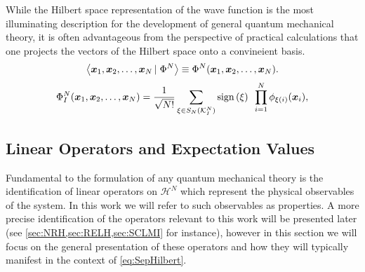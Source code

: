 While the Hilbert space representation of the wave function is the most illuminating description for the development of
general quantum mechanical theory, it is often advantageous from the perspective of practical calculations that one
projects the vectors of the Hilbert space onto a convineient basis. 
\begin{equation}
  \left\langle \boldsymbol{x}_1,\boldsymbol{x}_2,\ldots,\boldsymbol{x}_N \left\vert\right. \Phi^N \right\rangle \equiv \Phi^N(\boldsymbol{x}_1,\boldsymbol{x}_2,\ldots,\boldsymbol{x}_N).
\end{equation}
\begin{equation}
  \label{eq:SlaterDetSpace}
  \Phi_I^N(\boldsymbol{x}_1,\boldsymbol{x}_2,\ldots,\boldsymbol{x}_N) = \frac{1}{\sqrt{N!}} \sum_{\xi \in S_N(\mathcal{K}^N_I)} \mathrm{sign}\left( \xi \right) \text{ } 
    \prod_{i = 1 }^N \phi_{\xi(i)}(\boldsymbol{x}_i),
\end{equation}

\subsection{Linear Operators and Expectation Values}
\label{sec:LO}

Fundamental to the formulation of any quantum mechanical theory is the identification of linear operators on $\mathcal{H}^N$
which represent the physical observables of the system. In this work we will refer to such observables as properties. A
more precise identification of the operators relevant to this work will be presented later 
(see \cref{sec:NRH,sec:RELH,sec:SCLMI} for instance), however in this section we will focus on the general presentation
of these operators and how they will typically manifest in the context of \cref{eq:SepHilbert}. 

